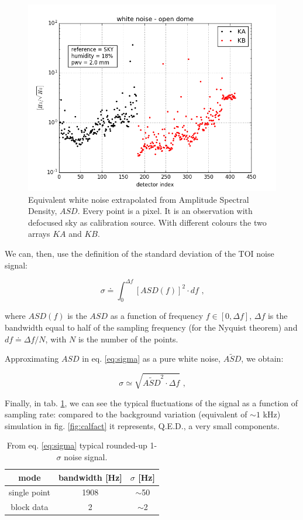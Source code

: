 \documentclass[twocolumn,traditabstract]{aa}\\
\begin{document}
\begin{figure}[htf]
	\centering
	\includegraphics[width=.5\textwidth]{4.results/white_noise_index.png}
	\caption{Equivalent white noise extrapolated from Amplitude Spectral Density, $ASD$. Every point is a pixel. It is an observation with defocused sky as calibration source. With different colours the two arrays $KA$ and $KB$.}
	\label{fig:ASD}
\end{figure}

\noindent  We can, then, use the definition of the standard deviation of the TOI noise signal:

\begin{equation}
\sigma \doteq \int_{0}^{\Delta f} \left[ASD(f) \right]^2\cdot df \text{ ,}
\label{eq:sigma}
\end{equation}

\noindent where $ASD(f)$ is the $ASD$ as a function of frequency $f\in[0,\Delta f]$, $\Delta f$ is the bandwidth equal to half of the sampling frequency (for the Nyquist theorem) and $df\doteq\Delta f/N$, with $N$ is the number of the points.

\noindent Approximating $ASD$ in eq. \ref{eq:sigma} as a pure white noise, $\tilde{ASD}$, we obtain:

\begin{equation}
\sigma\simeq \sqrt{ \tilde{ASD}^2 \cdot \Delta f } \text{ ,}
\end{equation}

\noindent Finally, in tab. \ref{tab:sigma_sig}, we can see the typical fluctuations of the signal as a function of sampling rate: compared to the background variation (equivalent of $\sim 1$ kHz) simulation in fig. \ref{fig:calfact} it represents, Q.E.D., a very small components.

\begin{table}[htf]
	\footnotesize
	\centering
	\caption{From eq. \ref{eq:sigma} typical rounded-up 1-$\sigma$ noise signal.}
	\begin{tabular}{ccc}
		\toprule
		\textbf{mode} & \textbf{bandwidth [Hz]} & \textbf{$\sigma$ [Hz]} \\
		\toprule
		single point & 1908 & $\sim$50 \\ 
		\midrule 
		block data & 2 & $\sim$2 \\ 
		\bottomrule
	\end{tabular}
	\label{tab:sigma_sig}
\end{table}
\end{document}
